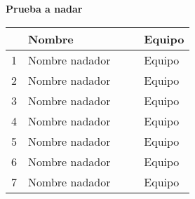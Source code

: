 \begin{minipage}{0.95\linewidth}
    \begin{flushleft}
        \textbf{
            Prueba a nadar
        }
    \end{flushleft}
    \begin{tabular}{cp{0.63\linewidth}l}
        \hline
          & \textbf{Nombre} & \textbf{Equipo} \\ \hline
        1 & Nombre nadador  & Equipo          \\
        2 & Nombre nadador  & Equipo          \\
        3 & Nombre nadador  & Equipo          \\
        4 & Nombre nadador  & Equipo          \\
        5 & Nombre nadador  & Equipo          \\
        6 & Nombre nadador  & Equipo          \\
        7 & Nombre nadador  & Equipo          \\
    \end{tabular}
\end{minipage}\vspace{0.5cm}
\\